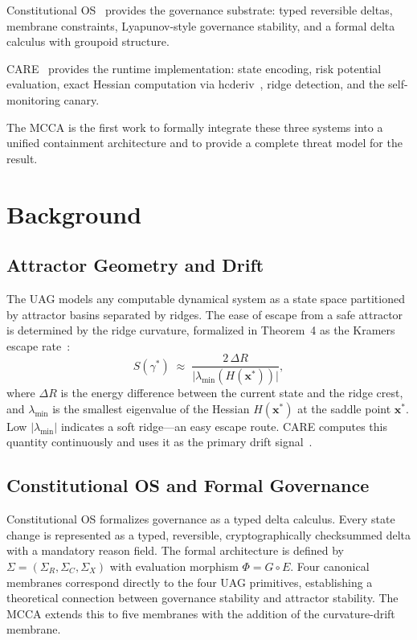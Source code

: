 \documentclass[11pt]{article}
\begin{document}
Constitutional OS~\cite{byte2026cos} provides the governance substrate:
typed reversible deltas, membrane constraints, Lyapunov-style governance
stability, and a formal delta calculus with groupoid structure.

CARE~\cite{byte2026care} provides the runtime implementation:
state encoding, risk potential evaluation, exact Hessian computation via
hcderiv~\cite{byte2026hcderiv}, ridge detection, and the self-monitoring
canary.

The MCCA is the first work to formally integrate these three systems into a
unified containment architecture and to provide a complete threat model for
the result.

\section{Background}

\subsection{Attractor Geometry and Drift}

The UAG models any computable dynamical system as a state space partitioned
by attractor basins separated by ridges.
The ease of escape from a safe attractor is determined by the ridge
curvature, formalized in Theorem~4 as the Kramers escape rate~\cite{kramers1940brownian}:
\begin{equation}
  S(\gamma^*) \;\approx\;
  \frac{2\,\Delta R}{\lvert\lambda_{\min}(H(\mathbf{x}^*))\rvert},
\end{equation}
where $\Delta R$ is the energy difference between the current state and the
ridge crest, and $\lambda_{\min}$ is the smallest eigenvalue of the Hessian
$H(\mathbf{x}^*)$ at the saddle point $\mathbf{x}^*$.
Low $|\lambda_{\min}|$ indicates a soft ridge---an easy escape route.
CARE computes this quantity continuously and uses it as the primary drift
signal~\cite{freidlin2012random}.

\subsection{Constitutional OS and Formal Governance}

Constitutional OS formalizes governance as a typed delta calculus.
Every state change is represented as a typed, reversible, cryptographically
checksummed delta with a mandatory reason field.
The formal architecture is defined by
$\Sigma = (\Sigma_R, \Sigma_C, \Sigma_X)$ with evaluation morphism
$\Phi = G \circ E$.
Four canonical membranes correspond directly to the four UAG primitives,
establishing a theoretical connection between governance stability and
attractor stability.
The MCCA extends this to five membranes with the addition of the
curvature-drift membrane.
\end{document}
